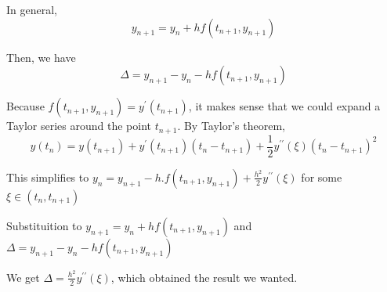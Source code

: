 \documentclass[a4paper]{article}
\begin{document}
In general,
$$
y_{n+1}=y_{n}+h f\left(t_{n+1}, y_{n+1}\right)
$$

Then, we have
$$
\Delta=y_{n+1}-y_{n}-h f\left(t_{n+1}, y_{n+1}\right)
$$

Because $f\left(t_{n+1}, y_{n+1}\right)=y^{\prime}\left(t_{n+1}\right)$, it makes sense that we could expand a Taylor series around the point $t_{n+1}$. By Taylor's theorem,
$$
y\left(t_{n}\right)=y\left(t_{n+1}\right)+y^{\prime}\left(t_{n+1}\right)\left(t_{n}-t_{n+1}\right)+\frac{1}{2} y^{\prime \prime}(\xi)\left(t_{n}-t_{n+1}\right)^{2}
$$

This simplifies to $y_{n}=y_{n+1}-h . f\left(t_{n+1}, y_{n+1}\right)+\frac{h^{2}}{2} y^{\prime \prime}(\xi)$ for some $\xi \in\left(t_{n}, t_{n+1}\right)$

Substituition to $y_{n+1}=y_{n}+h f\left(t_{n+1}, y_{n+1}\right)$ and $\Delta=y_{n+1}-y_{n}-h f\left(t_{n+1}, y_{n+1}\right)$

We get $\Delta=\frac{h^{2}}{2} y^{\prime \prime}(\xi)$, which obtained the result we wanted.
\end{document}
